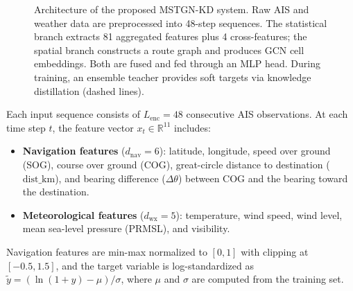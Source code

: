 \documentclass[conference]{IEEEtran}
\begin{document}
\begin{figure}[t]
\caption{Architecture of the proposed MSTGN-KD system. Raw AIS and weather data are preprocessed into 48-step sequences. The statistical branch extracts 81 aggregated features plus 4 cross-features; the spatial branch constructs a route graph and produces GCN cell embeddings. Both are fused and fed through an MLP head. During training, an ensemble teacher provides soft targets via knowledge distillation (dashed lines).}
\label{fig:architecture}
\end{figure}

Each input sequence consists of $L_{\text{enc}} = 48$ consecutive AIS observations. At each time step $t$, the feature vector $x_t \in \mathbb{R}^{11}$ includes:
\begin{itemize}
    \item \textbf{Navigation features} ($d_{\text{nav}} = 6$): latitude, longitude, speed over ground (SOG), course over ground (COG), great-circle distance to destination ($\text{dist\_km}$), and bearing difference ($\Delta\theta$) between COG and the bearing toward the destination.
    \item \textbf{Meteorological features} ($d_{\text{wx}} = 5$): temperature, wind speed, wind level, mean sea-level pressure (PRMSL), and visibility.
\end{itemize}
Navigation features are min-max normalized to $[0,1]$ with clipping at $[-0.5,1.5]$, and the target variable is log-standardized as $\tilde{y} = (\ln(1+y)-\mu)/\sigma$, where $\mu$ and $\sigma$ are computed from the training set.
\end{document}
